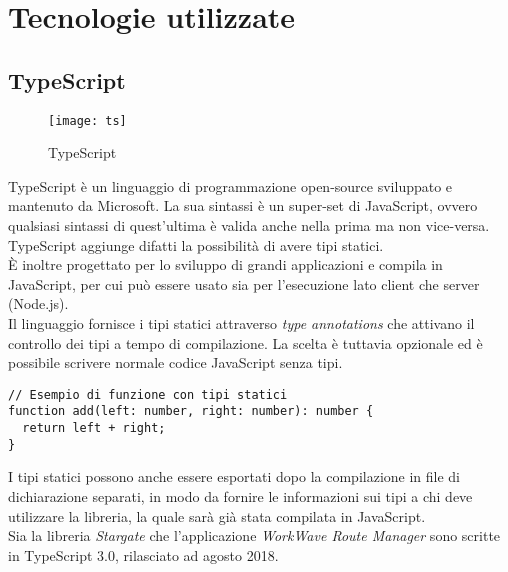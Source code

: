 
\chapter{Tecnologie utilizzate}
\label{tecnologie}

\section{TypeScript}

\begin{figure}[H] 
  \centering 
  \texttt{[image: ts]} 
  \caption{TypeScript}
\end{figure}

TypeScript è un linguaggio di programmazione open-source sviluppato e mantenuto da Microsoft. La sua sintassi è un super-set di JavaScript, ovvero qualsiasi sintassi di quest'ultima è valida anche nella prima ma non vice-versa. TypeScript aggiunge difatti la possibilità di avere tipi statici. \\

È inoltre progettato per lo sviluppo di grandi applicazioni e compila in JavaScript, per cui può essere usato sia per l'esecuzione lato client che server (Node.js). \\

Il linguaggio fornisce i tipi statici attraverso \textit{type annotations} che attivano il controllo dei tipi a tempo di compilazione. La scelta è tuttavia opzionale ed è possibile scrivere normale codice JavaScript senza tipi. \\

\begin{lstlisting}[language={[Sharp]C},basicstyle=\footnotesize]
// Esempio di funzione con tipi statici
function add(left: number, right: number): number {
  return left + right;
}
\end{lstlisting}

I tipi statici possono anche essere esportati dopo la compilazione in file di dichiarazione separati, in modo da fornire le informazioni sui tipi a chi deve utilizzare la libreria, la quale sarà già stata compilata in JavaScript. \\

Sia la libreria \textit{Stargate} che l'applicazione \textit{WorkWave Route Manager} sono scritte in TypeScript 3.0, rilasciato ad agosto 2018.

